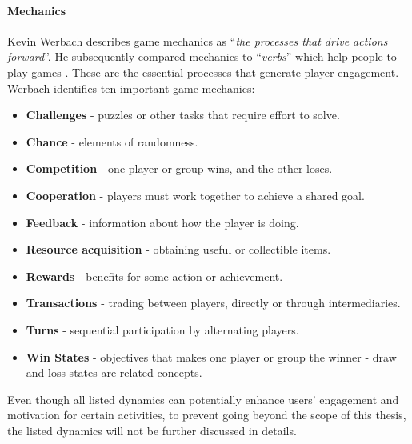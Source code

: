\paragraph{Mechanics}
Kevin Werbach describes game mechanics as ``\textit{the processes that drive actions forward}''. He subsequently compared mechanics to ``\textit{verbs}'' which help people to play games \cite{werbach2012win}. These are the essential processes that generate player engagement. Werbach identifies ten important game mechanics:
\begin{itemize}
\item \textbf{Challenges} - puzzles or other tasks that require effort to solve.
\item \textbf{Chance} - elements of randomness.
\item \textbf{Competition} - one player or group wins, and the other loses. 
\item \textbf{Cooperation} - players must work together to achieve a shared goal.
\item \textbf{Feedback} - information about how the player is doing.
\item \textbf{Resource acquisition} - obtaining useful or collectible items.
\item \textbf{Rewards} - benefits for some action or achievement.
\item \textbf{Transactions} - trading between players, directly or through intermediaries.
\item \textbf{Turns} - sequential participation by alternating players.
\item \textbf{Win States} - objectives that makes one player or group the winner - draw and loss states are related concepts.
\end{itemize}
Even though all listed dynamics can potentially enhance users' engagement and motivation for certain activities, to prevent going beyond the scope of this thesis, the listed dynamics will not be further discussed in details. 

